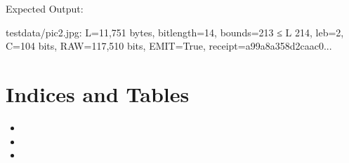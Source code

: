 \documentclass[letterpaper,10pt,english]{sphinxmanual}
\begin{document}
\sphinxAtStartPar
Expected Output:

\begin{sphinxVerbatim}[commandchars=\\\{\}]
test\PYGZus{}data/pic2.jpg: L=11,751 bytes, bit\PYGZus{}length=14, bounds=2\PYGZca{}13 ≤ L \PYGZlt{} 2\PYGZca{}14,
leb=2, C=104 bits, RAW=117,510 bits, EMIT=True, receipt=a99a8a358d2caac0...
\end{sphinxVerbatim}


\chapter{Indices and Tables}
\label{\detokenize{index:indices-and-tables}}\begin{itemize}
\item {} 
\sphinxAtStartPar
{}

\item {} 
\sphinxAtStartPar
{}

\item {} 
\sphinxAtStartPar
{}

\end{itemize}


\renewcommand{\indexname}{Python Module Index}
\begin{sphinxtheindex}
\let\bigletter\sphinxstyleindexlettergroup
\bigletter{c}
\item\relax{}
\item\relax{}
\end{sphinxtheindex}

\renewcommand{\indexname}{Index}
\printindex
\end{document}
